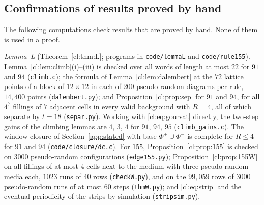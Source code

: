 \subsection{Confirmations of results proved by hand}\label{app:confirm}

The following computations check results that are proved by hand. None of them is used in a proof.

\emph{Lemma~L} (Theorem~\ref{cl:thm:L}; programs in \texttt{code/lemmaL} and \texttt{code/rule155}). Lemma~\ref{cl:lem:climb}(i)--(iii) is checked over all words of length at most $22$ for $91$ and $94$ (\texttt{climb.c}); the formula of Lemma~\ref{cl:lem:dalembert} at the $72$ lattice points of a block of $12\times12$ in each of $200$ pseudo-random diagrams per rule, $14{,}400$ points (\texttt{dalembert.py}); and Proposition~\ref{cl:prop:sep} for $91$ and $94$, for all $4^7$ fillings of $7$ adjacent cells in every valid background with $R=4$, all of which separate by $t=18$ (\texttt{separ.py}). Working with \eqref{cl:eq:goursat} directly, the two-step gains of the climbing lemmas are $4$, $3$, $4$ for $91$, $94$, $95$ (\texttt{climb\_gains.c}). The window closure of Section~\ref{app:stated} with base $\Phi^+\cup\Phi^-$ is complete for $R\le4$ for $91$ and $94$ (\texttt{code/closure/dc.c}). For $155$, Proposition~\ref{cl:prop:155} is checked on $3000$ pseudo-random configurations (\texttt{edge155.py}); Proposition~\ref{cl:prop:155W} on all fillings of at most $4$ cells next to the medium with three pseudo-random media each, $1023$ runs of $40$ rows (\texttt{checkW.py}), and on the $99{,}059$ rows of $3000$ pseudo-random runs of at most $60$ steps (\texttt{thmW.py}); and \eqref{cl:eq:strip} and the eventual periodicity of the strips by simulation (\texttt{stripsim.py}).

